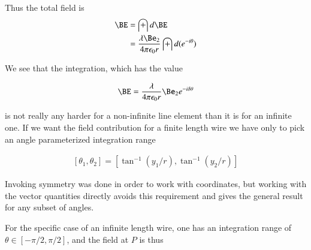 \documentclass{article}
\begin{document}
Thus the total field is
\begin{align*}
\BE
&= \int d\BE \\
&= \frac{\lambda \Be_2}{4 \pi \epsilon_0 r} \int d(e^{-i\theta}) \\
\end{align*}

We see that the integration, which has the value

\begin{align}
\BE = \frac{\lambda} {4 \pi \epsilon_0 r} \Be_2 e^{-i\delta\theta}
\end{align}

is not really any harder for a non-infinite line element than it is for an infinite one.  If we want the field
contribution for a finite length wire we have only to pick an angle parameterized integration range

\begin{align*}
[\theta_1, \theta_2] = [\tan^{-1}(y_1/r), \tan^{-1}(y_2/r)]
\end{align*}

Invoking symmetry was done in order to work with coordinates, but working with the vector quantities directly
avoids this requirement and gives the general result for any subset of angles.

For the specific case of an infinite length wire, one has an integration range of $\theta \in [-\pi/2, \pi/2]$, and
the field at $P$ is thus

\begin{align*}
\end{align*}



\end{document}
